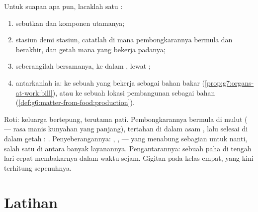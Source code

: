 \begin{method}\label{met:g7:digestion-and-nutrients:trace}
Untuk suapan apa pun, lacaklah satu :
\begin{enumerate}
  \item sebutkan  dan komponen utamanya;
  \item stasiun demi stasiun, catatlah di mana pembongkarannya bermula
        dan berakhir, dan getah mana yang bekerja padanya;
  \item seberangilah  bersamanya, ke dalam ,
        lewat ;
  \item antarkanlah ia: ke sebuah  yang bekerja sebagai bahan bakar
        (\cref{prop:g7:organs-at-work:bill}), atau ke sebuah lokasi
        pembangunan sebagai bahan
        (\cref{def:g6:matter-from-food:production}).
\end{enumerate}
\end{method}

\begin{example}\label{ex:g7:digestion-and-nutrients:breadtrace}
Roti: keluarga bertepung, terutama pati. Pembongkarannya bermula di
mulut ( --- rasa manis kunyahan yang panjang), tertahan di
dalam asam , lalu selesai di dalam getah :
. Penyeberangannya: , ,  --- yang menabung
sebagian  untuk nanti, salah satu di antara banyak
layanannya. Pengantarannya: sebuah  paha di tengah lari cepat
membakarnya dalam waktu sejam. Gigitan pada kelas empat, yang kini
terhitung sepenuhnya.
\end{example}

\section{Latihan}

